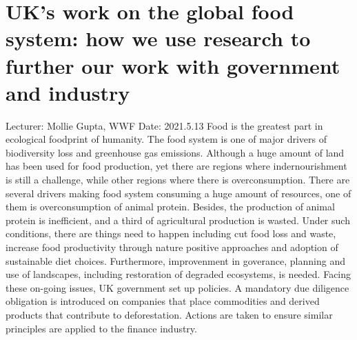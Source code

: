 \documentclass[11pt]{article}
\begin{document}
  \section{UK's work on the global food system: how we use research to further our work with government and industry}
  Lecturer: Mollie Gupta, WWF
  \newline
  Date: 2021.5.13
  \newline
  Food is the greatest part in ecological foodprint of humanity. 
  The food system is one of major drivers of biodiversity loss and greenhouse gas emissions. 
  Although a huge amount of land has been used for food production, yet there are regions where indernourishment is still a challenge, while other regions where there is overconsumption.
  \newline
  There are several drivers making food system consuming a huge amount of resources, one of them is overconsumption of animal protein. 
  Besides, the production of animal protein is inefficient, and a third of agricultural production is wasted. 
  Under such conditions, there are things need to happen including cut food loss and waste, increase food productivity through nature positive approaches and adoption of sustainable diet choices. 
  Furthermore, improvenment in goverance, planning and use of landscapes, including restoration of degraded ecosystems, is needed. 
  \newline 
  Facing these on-going issues, UK government set up policies. 
  A mandatory due diligence obligation is introduced on companies that place commodities and derived products that contribute to deforestation. Actions are taken to ensure similar principles are applied to the finance industry.
   


  



  

  




\end{document}
